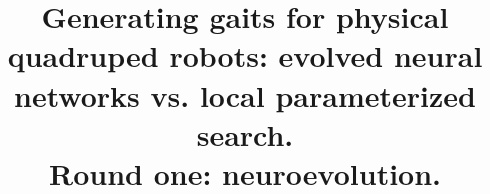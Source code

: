 \documentclass{sig-alternate}
\begin{document}
%

\title{Generating gaits for physical quadruped robots: evolved neural networks vs. local parameterized search. \\Round one: neuroevolution.}
%
%
%
%
%

%
\end{document}
